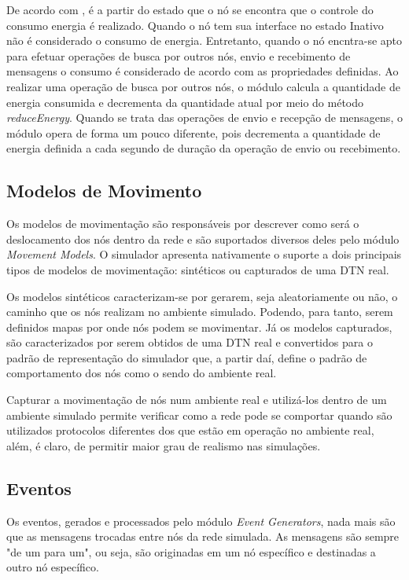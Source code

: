 De acordo com \cite{denis_artigo}, é a partir do estado que o nó se encontra que o controle do consumo energia é realizado. Quando o nó tem sua interface no estado Inativo não é considerado o consumo de energia. Entretanto, quando o nó encntra-se apto para efetuar operações de busca por outros nós, envio e recebimento de mensagens o consumo é considerado de acordo com as propriedades definidas. Ao realizar uma operação de busca por outros nós, o módulo calcula a quantidade de energia consumida e decrementa da quantidade atual por meio do método \emph{reduceEnergy}. Quando se trata das operações de envio e recepção de mensagens, o módulo opera de forma um pouco diferente, pois decrementa a quantidade de energia definida a cada segundo de duração da operação de envio ou recebimento.

\subsection{Modelos de Movimento}

Os modelos de movimentação são responsáveis por descrever como será o deslocamento dos nós dentro da rede e são suportados diversos deles pelo módulo \emph{Movement Models}. O simulador apresenta nativamente o suporte a dois principais tipos de modelos de movimentação: sintéticos ou capturados de uma DTN real.

Os modelos sintéticos caracterizam-se por gerarem, seja aleatoriamente ou não, o caminho que os nós realizam no ambiente simulado. Podendo, para tanto, serem definidos mapas por onde nós podem se movimentar. Já os modelos capturados, são caracterizados por serem obtidos de uma DTN real e convertidos para o padrão de representação do simulador que, a partir daí, define o padrão de comportamento dos nós como o sendo do ambiente real.

Capturar a movimentação de nós num ambiente real e utilizá-los dentro de um ambiente simulado permite verificar como a rede pode se comportar quando são utilizados protocolos diferentes dos que estão em operação no ambiente real, além, é claro, de permitir maior grau de realismo nas simulações.

\subsection{Eventos}

Os eventos, gerados e processados pelo módulo \emph{Event Generators}, nada mais são que as mensagens trocadas entre nós da rede simulada. As mensagens são sempre "de um para um", ou seja, são originadas em um nó específico e destinadas a outro nó específico.

